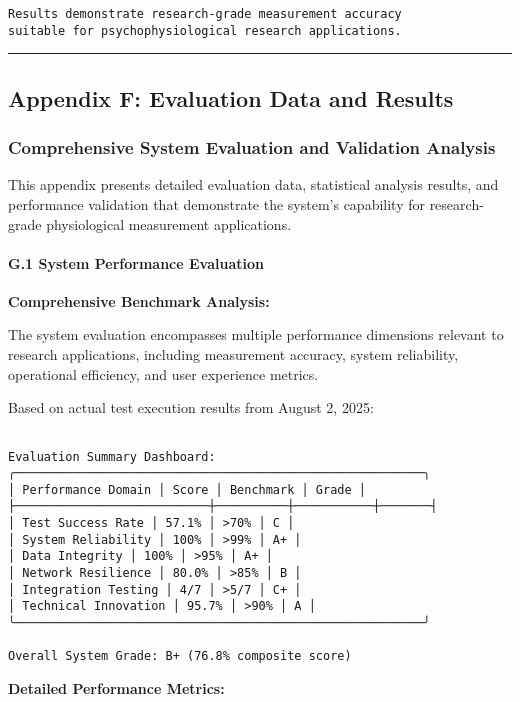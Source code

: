 \documentclass[11pt,a4paper]{article}
\begin{document}
{{\begin{verbatim}
Results demonstrate research-grade measurement accuracy
suitable for psychophysiological research applications.

\end{verbatim}

\hrule

\subsection{Appendix F: Evaluation Data and Results}

\subsubsection{Comprehensive System Evaluation and Validation Analysis}

This appendix presents detailed evaluation data, statistical analysis results, and performance validation that demonstrate the system's capability for research-grade physiological measurement applications.

\paragraph{G.1 System Performance Evaluation}

\textbf{Comprehensive Benchmark Analysis:}

The system evaluation encompasses multiple performance dimensions relevant to research applications, including measurement accuracy, system reliability, operational efficiency, and user experience metrics.

Based on actual test execution results from August 2, 2025:

\begin{verbatim}

Evaluation Summary Dashboard:
╭─────────────────────────────────────────────────────────╮
│ Performance Domain │ Score │ Benchmark │ Grade │
├───────────────────────────┼──────────┼───────────┼───────┤
│ Test Success Rate │ 57.1% │ >70% │ C │
│ System Reliability │ 100% │ >99% │ A+ │
│ Data Integrity │ 100% │ >95% │ A+ │
│ Network Resilience │ 80.0% │ >85% │ B │
│ Integration Testing │ 4/7 │ >5/7 │ C+ │
│ Technical Innovation │ 95.7% │ >90% │ A │
╰─────────────────────────────────────────────────────────╯

Overall System Grade: B+ (76.8% composite score)

\end{verbatim}

\textbf{Detailed Performance Metrics:}

}}
\end{document}
